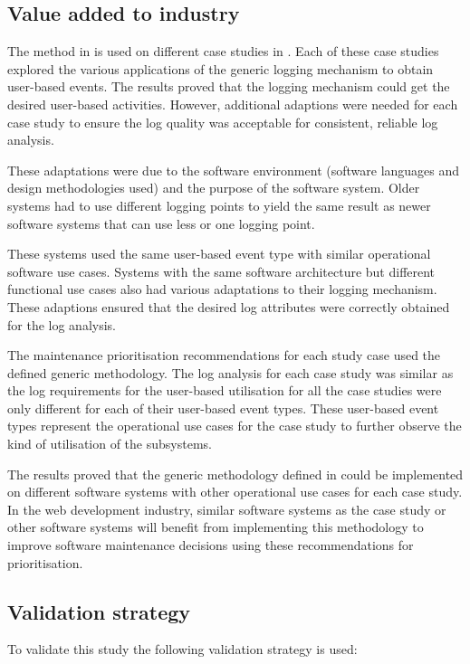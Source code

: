 \subsection{Value added to industry}
The method in  is used on different case studies in . Each of these case studies explored the various applications of the generic logging mechanism to obtain user-based events. The results proved that the logging mechanism could get the desired user-based activities. However, additional adaptions were needed for each case study to ensure the log quality was acceptable for consistent, reliable log analysis.\par These adaptations were due to the software environment (software languages and design methodologies used) and the purpose of the software system. Older systems had to use different logging points to yield the same result as newer software systems that can use less or one logging point.\par These systems used the same user-based event type with similar operational software use cases. Systems with the same software architecture but different functional use cases also had various adaptations to their logging mechanism. These adaptions ensured that the desired log attributes were correctly obtained for the log analysis. \par The maintenance prioritisation recommendations for each study case used the defined generic methodology. The log analysis for each case study was similar as the log requirements for the user-based utilisation for all the case studies were only different for each of their user-based event types. These user-based event types represent the operational use cases for the case study to further observe the kind of utilisation of the subsystems. \par The results proved that the generic methodology defined in  could be implemented on different software systems with other operational use cases for each case study. In the web development industry, similar software systems as the case study or other software systems will benefit from implementing this methodology to improve software maintenance decisions using these recommendations for prioritisation.

\subsection{Validation strategy}
To validate this study the following validation strategy is used:

